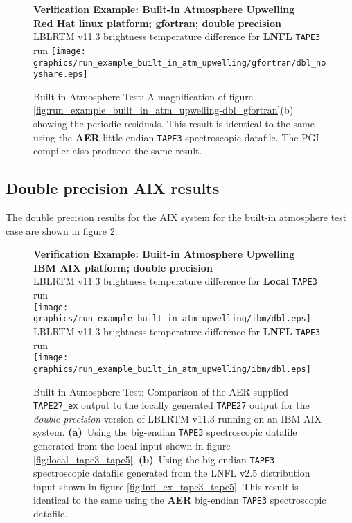 \begin{figure}[htp]
  \centering
  \qquad\sffamily\textbf{Verification Example: Built-in Atmosphere Upwelling}\\
  \qquad\sffamily\textbf{Red Hat linux platform; gfortran; double precision}\\
  \qquad\textsf{LBLRTM v11.3 brightness temperature difference for \textbf{LNFL} \texttt{TAPE3} run}
  \texttt{[image: graphics/run\_example\_built\_in\_atm\_upwelling/gfortran/dbl\_noyshare.eps]}
  \caption{Built-in Atmosphere Test: A magnification of figure \ref{fig:run_example_built_in_atm_upwelling-dbl_gfortran}(b) showing the periodic residuals. This result is identical to the same using the \textbf{AER} little-endian \texttt{TAPE3} spectroscopic datafile. The PGI compiler also produced the same result.}
  \label{fig:run_example_built_in_atm_upwelling-dbl_gfortran_noyshare}
\end{figure}


\subsection{Double precision AIX results}
The double precision results for the AIX system for the built-in atmosphere test case are shown in figure \ref{fig:run_example_built_in_atm_upwelling-dbl_ibm}.

\begin{figure}[htp]
  \centering
  \qquad\sffamily\textbf{Verification Example: Built-in Atmosphere Upwelling}\\
  \qquad\sffamily\textbf{IBM AIX platform; double precision}\\
  \qquad\textsf{LBLRTM v11.3 brightness temperature difference for \textbf{Local} \texttt{TAPE3} run}\\
  \texttt{[image: graphics/run\_example\_built\_in\_atm\_upwelling/ibm/dbl.eps]}
  \qquad\textsf{LBLRTM v11.3 brightness temperature difference for \textbf{LNFL} \texttt{TAPE3} run}\\
  \texttt{[image: graphics/run\_example\_built\_in\_atm\_upwelling/ibm/dbl.eps]}
  \caption{Built-in Atmosphere Test: Comparison of the AER-supplied \texttt{TAPE27\_ex} output to the locally generated \texttt{TAPE27} output for the \textsl{double precision} version of LBLRTM v11.3 running on an IBM AIX system. \mbox{\textbf{(a)} Using} the big-endian \texttt{TAPE3} spectroscopic datafile generated from the local input shown in figure \ref{fig:local_tape3_tape5}. \mbox{\textbf{(b)} Using} the big-endian \texttt{TAPE3} spectroscopic datafile generated from the LNFL v2.5 distribution input shown in figure \ref{fig:lnfl_ex_tape3_tape5}. This result is identical to the same using the \textbf{AER} big-endian \texttt{TAPE3} spectroscopic datafile.}
  \label{fig:run_example_built_in_atm_upwelling-dbl_ibm}
\end{figure}

